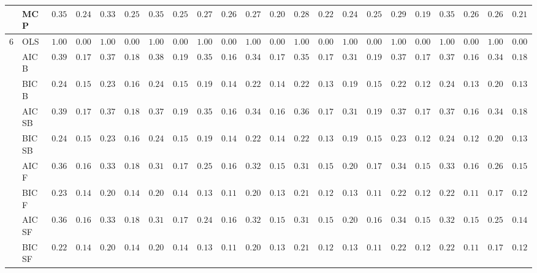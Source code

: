 \begin{tabular}{ll|ll|llllll|llllll|llllll}
 & MCP  & $0.3533$ & $0.2419$ & $0.3333$ & $0.2540$ & $0.3533$ & $0.2565$ & $0.2783$ & $0.2649$ & $0.2783$ & $0.2079$ & $0.2817$ & $0.2218$ & $0.2483$ & $0.2501$ & $0.2950$ & $0.1951$ & $0.3500$ & $0.2600$ & $0.2617$ & $0.2109$ \\\hline
6 & OLS  & $1.0000$ & $0.0000$ & $1.0000$ & $0.0000$ & $1.0000$ & $0.0000$ & $1.0000$ & $0.0000$ & $1.0000$ & $0.0000$ & $1.0000$ & $0.0000$ & $1.0000$ & $0.0000$ & $1.0000$ & $0.0000$ & $1.0000$ & $0.0000$ & $1.0000$ & $0.0000$ \\
 & AIC B  & $0.3900$ & $0.1792$ & $0.3733$ & $0.1852$ & $0.3800$ & $0.1969$ & $0.3500$ & $0.1633$ & $0.3433$ & $0.1705$ & $0.3583$ & $0.1794$ & $0.3150$ & $0.1995$ & $0.3750$ & $0.1731$ & $0.3750$ & $0.1681$ & $0.3450$ & $0.1854$ \\
 & BIC B  & $0.2433$ & $0.1525$ & $0.2317$ & $0.1690$ & $0.2450$ & $0.1544$ & $0.1900$ & $0.1441$ & $0.2200$ & $0.1419$ & $0.2217$ & $0.1320$ & $0.1933$ & $0.1548$ & $0.2267$ & $0.1287$ & $0.2417$ & $0.1306$ & $0.2083$ & $0.1369$ \\
 & AIC SB  & $0.3933$ & $0.1797$ & $0.3733$ & $0.1852$ & $0.3783$ & $0.1994$ & $0.3500$ & $0.1633$ & $0.3467$ & $0.1686$ & $0.3617$ & $0.1758$ & $0.3150$ & $0.1995$ & $0.3767$ & $0.1702$ & $0.3750$ & $0.1681$ & $0.3450$ & $0.1854$ \\
 & BIC SB  & $0.2433$ & $0.1525$ & $0.2317$ & $0.1690$ & $0.2450$ & $0.1544$ & $0.1917$ & $0.1448$ & $0.2217$ & $0.1403$ & $0.2233$ & $0.1302$ & $0.1950$ & $0.1554$ & $0.2300$ & $0.1293$ & $0.2433$ & $0.1285$ & $0.2083$ & $0.1369$ \\
 & AIC F  & $0.3617$ & $0.1693$ & $0.3333$ & $0.1820$ & $0.3183$ & $0.1742$ & $0.2500$ & $0.1667$ & $0.3233$ & $0.1532$ & $0.3183$ & $0.1519$ & $0.2083$ & $0.1747$ & $0.3417$ & $0.1505$ & $0.3317$ & $0.1615$ & $0.2600$ & $0.1595$ \\
 & BIC F  & $0.2300$ & $0.1437$ & $0.2083$ & $0.1467$ & $0.2067$ & $0.1463$ & $0.1317$ & $0.1119$ & $0.2050$ & $0.1316$ & $0.2100$ & $0.1245$ & $0.1383$ & $0.1162$ & $0.2200$ & $0.1273$ & $0.2283$ & $0.1176$ & $0.1717$ & $0.1241$ \\
 & AIC SF  & $0.3617$ & $0.1676$ & $0.3333$ & $0.1820$ & $0.3150$ & $0.1739$ & $0.2483$ & $0.1650$ & $0.3217$ & $0.1503$ & $0.3167$ & $0.1526$ & $0.2017$ & $0.1646$ & $0.3417$ & $0.1505$ & $0.3233$ & $0.1586$ & $0.2550$ & $0.1488$ \\
 & BIC SF  & $0.2283$ & $0.1415$ & $0.2050$ & $0.1418$ & $0.2067$ & $0.1463$ & $0.1300$ & $0.1100$ & $0.2050$ & $0.1316$ & $0.2100$ & $0.1245$ & $0.1383$ & $0.1162$ & $0.2200$ & $0.1273$ & $0.2283$ & $0.1176$ & $0.1717$ & $0.1241$ \\

\end{tabular}
